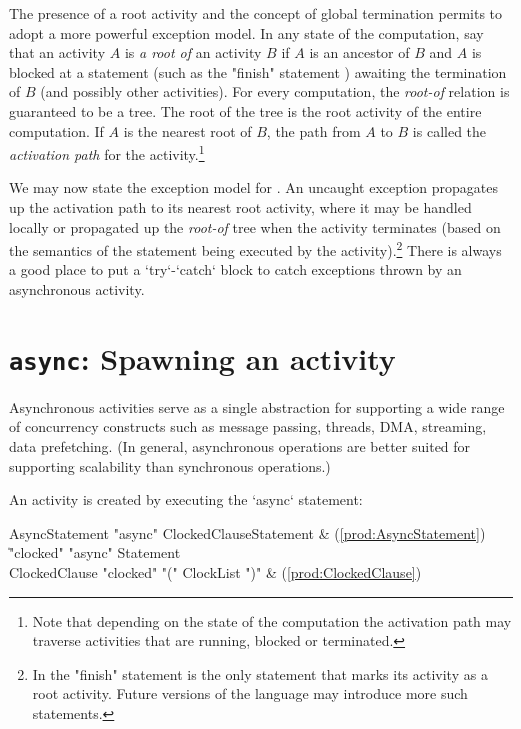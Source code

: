 The presence of a root activity and the concept of global termination permits
\Xten{} to adopt a more powerful exception model. In any state of the
computation, say that an activity $A$ is {\em a root of} an activity $B$ if
$A$ is an ancestor of $B$ and $A$ is blocked at a statement (such as the
\xcd"finish" statement ) awaiting the termination of $B$ (and
possibly other activities). For every \Xten{} computation, the \emph{root-of}
relation is guaranteed to be a tree. The root of the tree is the root activity
of the entire computation. If $A$ is the nearest root of $B$, the path from
$A$ to $B$ is called the {\em activation path} for the activity.\footnote{Note
  that depending on the state of the computation the activation path may
  traverse activities that are running, blocked or terminated.}

We may now state the exception model for \Xten.  An uncaught exception
propagates up the activation path to its nearest root activity, where
it may be handled locally or propagated up the \emph{root-of} tree when
the activity terminates (based on the semantics of the statement being
executed by the activity).\footnote{In \XtenCurrVer{} the \xcd"finish"
statement is the only statement that marks its activity as a root
activity. Future versions of the language may introduce more such
statements.}  
There is always a good place to put a \xcd`try`-\xcd`catch` block to catch
exceptions thrown by an asynchronous activity.

\section{{\tt async}: Spawning an activity}\label{AsynchronousActivity}\label{AsyncActivity}

Asynchronous activities serve as a single abstraction for supporting a
wide range of concurrency constructs such as message passing, threads,
DMA, streaming, data prefetching. (In general, asynchronous operations
are better suited for supporting scalability than synchronous
operations.)

An activity is created by executing the \xcd`async` statement: 

\begin{bbgrammar}
      AsyncStatement \: \xcd"async" ClockedClause\opt Statement & (\ref{prod:AsyncStatement}) \\
                    \| \xcd"clocked" \xcd"async" Statement \\
       ClockedClause \: \xcd"clocked" \xcd"(" ClockList \xcd")" & (\ref{prod:ClockedClause}) \\
\end{bbgrammar}


